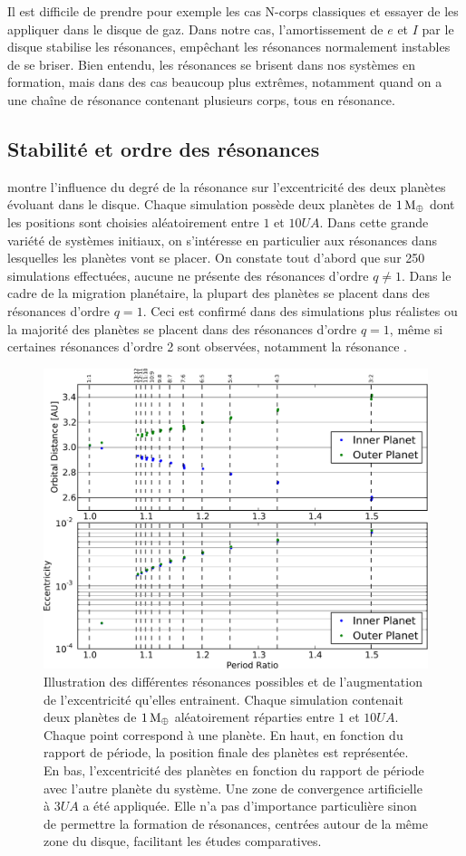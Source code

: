 Il est difficile de prendre pour exemple les cas N-corps classiques et essayer de les appliquer dans le disque de gaz. Dans
notre cas, l'amortissement de $e$ et $I$ par le disque stabilise les résonances, empêchant les résonances normalement instables
de se briser. Bien entendu, les résonances se brisent dans nos systèmes en formation, mais dans des cas beaucoup plus extrêmes,
notamment quand on a une chaîne de résonance contenant plusieurs corps, tous en résonance. 

\subsection{Stabilité et ordre des résonances}
 montre l'influence du degré de la résonance sur l'excentricité des deux planètes évoluant dans le
disque. Chaque simulation possède deux planètes de $1\mathrm{\thinspace M_\oplus}$ dont les positions sont choisies aléatoirement entre $1$ et $10\unit{UA}$. Dans cette grande variété de systèmes initiaux, on s'intéresse en particulier aux résonances dans lesquelles les planètes vont se placer. On
constate tout d'abord que sur 250 simulations effectuées, aucune ne présente des résonances d'ordre $q\neq 1$. Dans le cadre de la migration planétaire, la plupart des planètes se placent dans des résonances d'ordre $q=1$. Ceci est confirmé dans des simulations plus réalistes ou la majorité des planètes se placent dans des résonances d'ordre $q=1$, même si certaines résonances d'ordre 2 sont observées, notamment la résonance .


\begin{figure}[htbp]
\centering
\includegraphics[width=0.75\linewidth]{figure/MMR_statistique.pdf}
\caption[Influence de l'ordre de la résonance sur le niveau d'excentricité maintenu.]{Illustration des différentes résonances
possibles et de l'augmentation de l'excentricité qu'elles entrainent. Chaque
simulation contenait deux planètes de $1\mathrm{\thinspace M_\oplus}$ aléatoirement réparties entre $1$ et $10\unit{UA}$. Chaque point correspond à
une planète. En haut, en fonction du rapport de période, la position finale des planètes est
représentée. En bas, l'excentricité des planètes en fonction du rapport de période avec l'autre planète du système. Une zone de
convergence artificielle à $3\unit{UA}$ a été appliquée. Elle n'a pas d'importance particulière sinon de permettre la formation
de résonances, centrées autour de la même zone du disque, facilitant les études comparatives.}\label{fig:MMR_statistique}
\end{figure}

